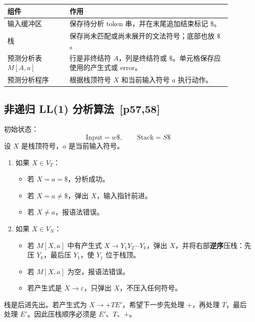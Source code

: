 \documentclass[UTF8,fontset=none,11pt]{ctexart}
\newenvironment{notebox}[1][]{%
  \par\medskip\noindent{\color{maincol}\rule{\linewidth}{1.1pt}}\par\nopagebreak
  \noindent{\bfseries\color{maincol}#1}\par\nopagebreak\smallskip}%
  {\par\nopagebreak\smallskip\noindent{\color{maincol}\rule{\linewidth}{0.4pt}}\par\medskip}
\newcommand{\pg}[1]{\texorpdfstring{{\small\color{graytext}\,[p#1]}}{ [p#1]}}
\newcommand{\eps}{\varepsilon}
\begin{document}
\begin{longtable}{p{0.25\linewidth}p{0.65\linewidth}}
\toprule
组件 & 作用 \\
\midrule
输入缓冲区 & 保存待分析 token 串，并在末尾追加结束标记 \(\$\)。\\
栈 & 保存尚未匹配或尚未展开的文法符号；底部也放 \(\$\)。\\
预测分析表 \(M[A,a]\) & 行是非终结符 \(A\)，列是终结符或 \(\$\)。单元格保存应使用的产生式或 error。\\
预测分析程序 & 根据栈顶符号 \(X\) 和当前输入符号 \(a\) 执行动作。\\
\bottomrule
\end{longtable}

\subsection{非递归 LL(1) 分析算法 \pg{57,58}}
初始状态：
\[
\text{Input}=w\$, \qquad \text{Stack}=S\$
\]
设 \(X\) 是栈顶符号，\(a\) 是当前输入符号。

\begin{enumerate}
  \item 如果 \(X\in V_T\)：
  \begin{itemize}
    \item 若 \(X=a=\$\)，分析成功。
    \item 若 \(X=a\ne\$\)，弹出 \(X\)，输入指针前进。
    \item 若 \(X\ne a\)，报语法错误。
  \end{itemize}
  \item 如果 \(X\in V_N\)：
  \begin{itemize}
    \item 若 \(M[X,a]\) 中有产生式 \(X\to Y_1Y_2\cdots Y_k\)，弹出 \(X\)，并将右部\textbf{逆序}压栈：先压 \(Y_k\)，最后压 \(Y_1\)，使 \(Y_1\) 位于栈顶。
    \item 若 \(M[X,a]\) 为空，报语法错误。
    \item 若产生式是 \(X\to\eps\)，只弹出 \(X\)，不压入任何符号。
  \end{itemize}
\end{enumerate}

\begin{notebox}[为什么右部要逆序入栈]
栈是后进先出。若产生式为 \(X\to +TE'\)，希望下一步先处理 \(+\)，再处理 \(T\)，最后处理 \(E'\)。因此压栈顺序必须是 \(E'\)、\(T\)、\(+\)。
\end{notebox}

\end{document}
